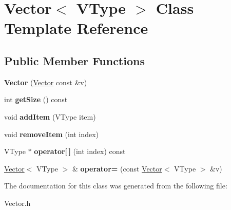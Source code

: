 \hypertarget{classVector}{}\section{Vector$<$ V\+Type $>$ Class Template Reference}
\label{classVector}
\subsection*{Public Member Functions}
\begin{DoxyCompactItemize}
\item 
{\bfseries Vector} (\hyperlink{classVector}{Vector} const \&v)\hypertarget{classVector_a5a15390f0d0690d39a506d34995115fb}{}\label{classVector_a5a15390f0d0690d39a506d34995115fb}

\item 
int {\bfseries get\+Size} () const \hypertarget{classVector_a6a849e5446a29f0bb6e7045b0ee9cacb}{}\label{classVector_a6a849e5446a29f0bb6e7045b0ee9cacb}

\item 
void {\bfseries add\+Item} (V\+Type item)\hypertarget{classVector_ad0d93c949edb6f8d1730e8b720ddda30}{}\label{classVector_ad0d93c949edb6f8d1730e8b720ddda30}

\item 
void {\bfseries remove\+Item} (int index)\hypertarget{classVector_a53e56985f7eb39e9ade6201273973d0f}{}\label{classVector_a53e56985f7eb39e9ade6201273973d0f}

\item 
V\+Type $\ast$ {\bfseries operator\mbox{[}$\,$\mbox{]}} (int index) const \hypertarget{classVector_a252991ae55962cbfad4b93428ff2cf9a}{}\label{classVector_a252991ae55962cbfad4b93428ff2cf9a}

\item 
\hyperlink{classVector}{Vector}$<$ V\+Type $>$ \& {\bfseries operator=} (const \hyperlink{classVector}{Vector}$<$ V\+Type $>$ \&v)\hypertarget{classVector_a42176b508a9999d9b57a291fd9746828}{}\label{classVector_a42176b508a9999d9b57a291fd9746828}

\end{DoxyCompactItemize}


The documentation for this class was generated from the following file\+:\begin{DoxyCompactItemize}
\item 
Vector.\+h\end{DoxyCompactItemize}
